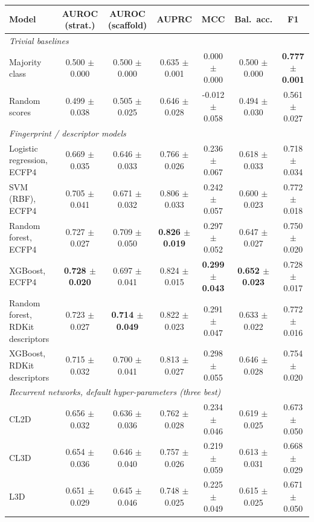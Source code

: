 \begin{tabular}{lcccccc}
\toprule
Model & AUROC (strat.) & AUROC (scaffold) & AUPRC & MCC & Bal.\ acc. & F1 \\
\midrule
\multicolumn{7}{l}{\emph{Trivial baselines}} \\
\quad Majority class & 0.500 $\pm$ 0.000 & 0.500 $\pm$ 0.000 & 0.635 $\pm$ 0.001 & 0.000 $\pm$ 0.000 & 0.500 $\pm$ 0.000 & \textbf{0.777 $\pm$ 0.001} \\
\quad Random scores & 0.499 $\pm$ 0.038 & 0.505 $\pm$ 0.025 & 0.646 $\pm$ 0.028 & -0.012 $\pm$ 0.058 & 0.494 $\pm$ 0.030 & 0.561 $\pm$ 0.027 \\
\multicolumn{7}{l}{\emph{Fingerprint / descriptor models}} \\
\quad Logistic regression, ECFP4 & 0.669 $\pm$ 0.035 & 0.646 $\pm$ 0.033 & 0.766 $\pm$ 0.026 & 0.236 $\pm$ 0.067 & 0.618 $\pm$ 0.033 & 0.718 $\pm$ 0.034 \\
\quad SVM (RBF), ECFP4 & 0.705 $\pm$ 0.041 & 0.671 $\pm$ 0.032 & 0.806 $\pm$ 0.033 & 0.242 $\pm$ 0.057 & 0.600 $\pm$ 0.023 & 0.772 $\pm$ 0.018 \\
\quad Random forest, ECFP4 & 0.727 $\pm$ 0.027 & 0.709 $\pm$ 0.050 & \textbf{0.826 $\pm$ 0.019} & 0.297 $\pm$ 0.052 & 0.647 $\pm$ 0.027 & 0.750 $\pm$ 0.020 \\
\quad XGBoost, ECFP4 & \textbf{0.728 $\pm$ 0.020} & 0.697 $\pm$ 0.041 & 0.824 $\pm$ 0.015 & \textbf{0.299 $\pm$ 0.043} & \textbf{0.652 $\pm$ 0.023} & 0.728 $\pm$ 0.017 \\
\quad Random forest, RDKit descriptors & 0.723 $\pm$ 0.027 & \textbf{0.714 $\pm$ 0.049} & 0.822 $\pm$ 0.023 & 0.291 $\pm$ 0.047 & 0.633 $\pm$ 0.022 & 0.772 $\pm$ 0.016 \\
\quad XGBoost, RDKit descriptors & 0.715 $\pm$ 0.032 & 0.700 $\pm$ 0.041 & 0.813 $\pm$ 0.027 & 0.298 $\pm$ 0.055 & 0.646 $\pm$ 0.028 & 0.754 $\pm$ 0.020 \\
\multicolumn{7}{l}{\emph{Recurrent networks, default hyper-parameters (three best)}} \\
\quad CL2D & 0.656 $\pm$ 0.032 & 0.636 $\pm$ 0.036 & 0.762 $\pm$ 0.028 & 0.234 $\pm$ 0.046 & 0.619 $\pm$ 0.025 & 0.673 $\pm$ 0.050 \\
\quad CL3D & 0.654 $\pm$ 0.036 & 0.646 $\pm$ 0.040 & 0.757 $\pm$ 0.026 & 0.219 $\pm$ 0.059 & 0.613 $\pm$ 0.031 & 0.668 $\pm$ 0.029 \\
\quad L3D & 0.651 $\pm$ 0.029 & 0.645 $\pm$ 0.046 & 0.748 $\pm$ 0.025 & 0.225 $\pm$ 0.049 & 0.615 $\pm$ 0.025 & 0.671 $\pm$ 0.050 \\

\end{tabular}

